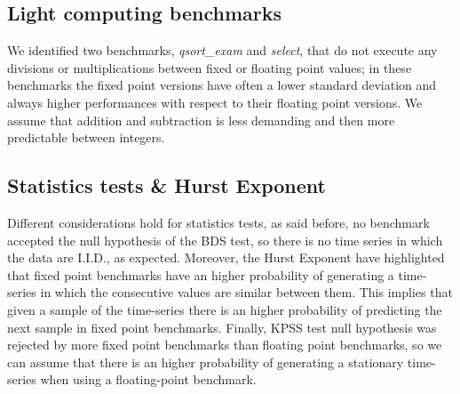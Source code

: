 \subsection{Light computing benchmarks}
We identified two benchmarks, \textit{qsort\_exam} and \textit{select}, that do not execute any divisions or multiplications between fixed or floating point values; in these benchmarks the fixed point versions have often a lower standard deviation and always higher performances with respect to their floating point versions.\newline
We assume that addition and subtraction is less demanding and then more predictable between integers.

\subsection{Statistics tests \& Hurst Exponent}
Different considerations hold for statistics tests, as said before, no benchmark accepted the null hypothesis of the BDS test, so there is no time series in which the data are I.I.D., as expected.
Moreover, the Hurst Exponent have highlighted that fixed point benchmarks have an higher probability of generating a time-series in which the consecutive values are similar between them. This implies that given a sample of the time-series there is an higher probability of predicting the next sample in fixed point benchmarks.\newline
Finally, KPSS test null hypothesis was rejected by more fixed point benchmarks than floating point benchmarks, so we can assume that there is an higher probability of generating a stationary time-series when using a floating-point benchmark.

